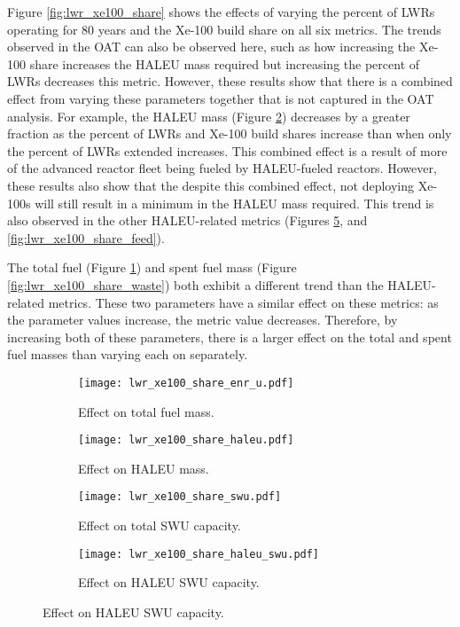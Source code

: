 Figure \ref{fig:lwr_xe100_share} shows the effects of varying the 
percent of \glspl{LWR} operating for 80 years and the Xe-100 
build share on all six metrics. The trends observed in the \gls{OAT} 
can also be observed here, such as how increasing the Xe-100 share 
increases the \gls{HALEU} mass required but increasing the 
percent of \glspl{LWR} decreases this metric. However, these results 
show that there is a combined effect from varying these parameters 
together that is not captured in the \gls{OAT} analysis. For 
example, the \gls{HALEU} mass (Figure \ref{fig:lwr_xe100_share_haleu}) 
decreases by a greater fraction 
as the percent of \glspl{LWR} and Xe-100 build shares increase than 
when only the percent of \glspl{LWR} extended increases. This combined 
effect is a result of more of the advanced reactor fleet being fueled 
by \gls{HALEU}-fueled reactors. However, these results also show that 
the despite this combined effect, not deploying Xe-100s will still
result in a minimum in the \gls{HALEU} mass required. This trend is also 
observed in the other \gls{HALEU}-related metrics (Figures \ref{fig:lwr_xe100_share_haleu_swu},
and \ref{fig:lwr_xe100_share_feed}). 

The total fuel (Figure \ref{fig:lwr_xe100_share_enr_u}) and spent fuel 
mass (Figure \ref{fig:lwr_xe100_share_waste}) both exhibit a different trend 
than the \gls{HALEU}-related metrics. These two parameters have a similar 
effect on these metrics: as the parameter values increase, the metric value 
decreases. Therefore, by increasing both of these parameters, there is a 
larger effect on the total and spent fuel masses than varying each on 
separately. 

\begin{figure}
    \begin{subfigure}[t]{0.48\textwidth}
        \centering
        \texttt{[image: lwr\_xe100\_share\_enr\_u.pdf]}
        \caption{Effect on total fuel mass.}
        \label{fig:lwr_xe100_share_enr_u}
    \end{subfigure}
    \hfill
    \begin{subfigure}[t]{0.48\textwidth}
        \centering
        \texttt{[image: lwr\_xe100\_share\_haleu.pdf]}
        \caption{Effect on HALEU mass.}
        \label{fig:lwr_xe100_share_haleu}
    \end{subfigure}  
    \begin{subfigure}[t]{0.48\textwidth}
        \centering
        \texttt{[image: lwr\_xe100\_share\_swu.pdf]}
        \caption{Effect on total SWU capacity.}
        \label{fig:lwr_xe100_share_swu}
    \end{subfigure}
    \hfill
    \begin{subfigure}[t]{0.48\textwidth}
        \centering
        \texttt{[image: lwr\_xe100\_share\_haleu\_swu.pdf]}
        \caption{Effect on HALEU SWU capacity.}
        \label{fig:lwr_xe100_share_haleu_swu}
    \end{subfigure}
\end{figure}

